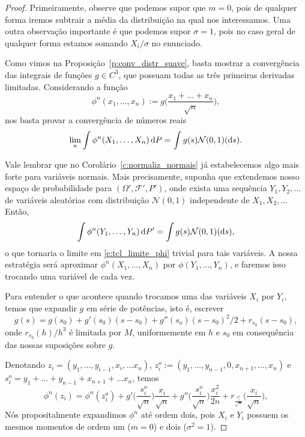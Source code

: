 \begin{proof}
  Primeiramente, observe que podemos supor que $m = 0$, pois de qualquer forma iremos subtrair a média da distribuição na qual nos interessamos.
  Uma outra observação importante é que podemos supor $\sigma = 1$, pois no caso geral de qualquer forma estamos somando $X_i/\sigma$ no enunciado.

  Como vimos na Proposição~\ref{p:conv_distr_suave}, basta mostrar a convergência das integrais de funções $g \in C^3$, que possuam todas as três primeiras derivadas limitadas.
  Considerando a função
  \begin{equation}
    \phi^n(x_1, \dots, x_n) := g\Big(\frac{x_1 + \dots + x_n}{\sqrt{n}} \Big),
  \end{equation}
  nos basta provar a convergência de números reais
  \begin{equation}
    \label{e:tcl_limite_phi}
    \lim_n \int \phi^n(X_1, \dots, X_n) \mathop{}\!\mathrm{d} P = \int g(s) \mathcal{N}(0,1)(\mathop{}\!\mathrm{d} s).
  \end{equation}

  Vale lembrar que no Corolário~\ref{c:normaliz_normais} já estabelecemos algo mais forte para variáveis normais.
  Mais precisamente, suponha que extendemos nosso espaço de probabilidade para $(\Omega', \mathcal{F}', P')$, onde exista uma sequência $Y_1, Y_2, \dots$ de variáveis aleatórias \iid com distribuição $\mathcal{N}(0,1)$ independente de $X_1, X_2, \dots$
  Então,
  \begin{equation}
    \int \phi^n(Y_1, \dots, Y_n) \mathop{}\!\mathrm{d} P' = \int g(s) \mathcal{N}(0,1) (\mathop{}\!\mathrm{d} s),
  \end{equation}
  o que tornaria o limite em \eqref{e:tcl_limite_phi} trivial para tais variáveis.
  A nossa estratégia será aproximar $\phi^n(X_1, \dots, X_n)$ por $\phi(Y_1, \dots, Y_n)$, e faremos isso trocando uma variável de cada vez.

  Para entender o que acontece quando trocamos uma das variáveis $X_i$ por $Y_i$, temos que expandir $g$ em série de potências, isto é, escrever
  \begin{equation}
    g(s) = g(s_0) + g'(s_0)(s - s_0) + g''(s_o)(s-s_0)^2/2 + r_{s_0}(s - s_0),
  \end{equation}
  onde $r_{s_0}(h)/h^3$ é limitada por $M$, uniformemente em $h$ e $s_0$ em consequência das nossas suposições sobre $g$.

  Denotando $z_i = (y_1, \dots, y_{i-1}, x_i, \dots x_n)$, $z_i^o := (y_1, \dots, y_{n-1}, 0, x_{n+1}, \dots, x_n)$ e $s_i^o = y_1 + \dots + y_{n-1} + x_{n+1} + \dots x_n$, temos
  \begin{equation}
    \phi^n(z_i) %
    = \phi^n(z_i^o) + g' \Big( \frac{s_i^o}{\sqrt{n}} \Big) \frac{x_i}{\sqrt{n}} + g'' \Big( \frac{s_i^o}{\sqrt{n}} \Big) \frac{x_i^2}{2n} + r_{\frac{s_i^o}{\sqrt{n}}} \Big( \frac{x_i}{\sqrt{n}} \Big),
  \end{equation}
  Nós propositalmente expandimos $\phi^n$ até ordem dois, pois $X_i$ e $Y_i$ possuem os mesmos momentos de ordem um ($m=0$) e dois ($\sigma^2=1$).


\end{proof}
